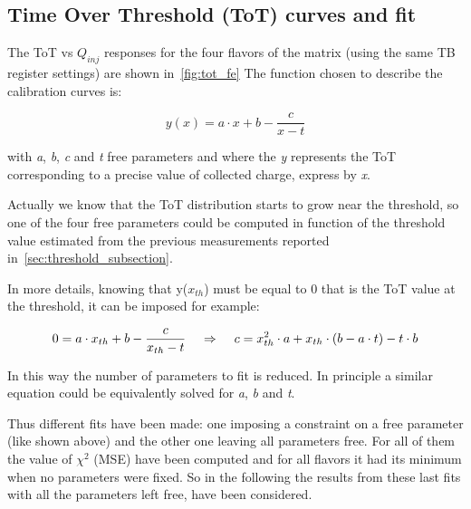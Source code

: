 \subsection{Time Over Threshold (ToT) curves and fit} \label{sec:tot_fit}

The ToT vs $Q_{inj}$ responses for the four flavors of the matrix (using the same TB register settings) are shown in~\autoref{fig:tot_fe}
The function chosen to describe the calibration curves is:

\begin{equation}
y(x) = a\cdot x +b -\frac{c}{x-t}
\label{eq:fit_function}
\end{equation}

with \textit{a}, \textit{b}, \textit{c} and \textit{t} free parameters and where the \textit{y} represents the ToT corresponding to a precise value of collected charge, express by \textit{x}. 

Actually we know that the ToT distribution starts to grow near the threshold, so one of the four free parameters could be computed in function of the threshold value estimated from the previous measurements reported in~\autoref{sec:threshold_subsection}.

In more details, knowing that y($x_{th}$) must be equal to 0 that is the ToT value at the threshold, it can be imposed for example:

\begin{equation}
0 = a\cdot x_{th} + b - \frac{c}{x_{th}-t}  \hspace{.4cm}	\Rightarrow  \hspace{.4cm}	c = x_{th}^{2}\cdot a + x_{th}\cdot (b-a\cdot t) - t\cdot b
\end{equation}

In this way the number of parameters to fit is reduced. In principle a similar equation could be equivalently solved for \textit{a}, \textit{b} and \textit{t}. 


Thus different fits have been made: one imposing a constraint on a free parameter (like shown above) and the other one leaving all parameters free. For all of them the value of $\chi^{2}$ (MSE) have been computed and for all flavors it had its minimum when no parameters were fixed. So in the following the results from these last fits with all the parameters left free, have been considered.\\

